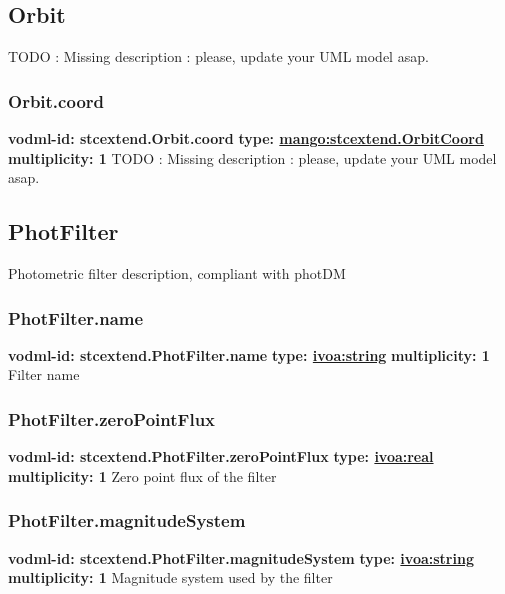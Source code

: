   \subsection{Orbit}
  \label{sect:stcextend.Orbit}
    TODO : Missing description : please, update your UML model asap.

    \subsubsection{Orbit.coord}
      \textbf{vodml-id: stcextend.Orbit.coord} \newline
      \textbf{type: \hyperref[sect:stcextend.OrbitCoord]{mango:stcextend.OrbitCoord}} \newline
      \textbf{multiplicity: 1} \newline 
      TODO : Missing description : please, update your UML model asap.

  \subsection{PhotFilter}
  \label{sect:stcextend.PhotFilter}
    Photometric filter description, compliant with photDM

    \subsubsection{PhotFilter.name}
      \textbf{vodml-id: stcextend.PhotFilter.name} \newline
      \textbf{type: \hyperref[sect:ivoa]{ivoa:string}} \newline
      \textbf{multiplicity: 1} \newline 
      Filter name

    \subsubsection{PhotFilter.zeroPointFlux}
      \textbf{vodml-id: stcextend.PhotFilter.zeroPointFlux} \newline
      \textbf{type: \hyperref[sect:ivoa]{ivoa:real}} \newline
      \textbf{multiplicity: 1} \newline 
      Zero point flux of the filter

    \subsubsection{PhotFilter.magnitudeSystem}
      \textbf{vodml-id: stcextend.PhotFilter.magnitudeSystem} \newline
      \textbf{type: \hyperref[sect:ivoa]{ivoa:string}} \newline
      \textbf{multiplicity: 1} \newline 
      Magnitude system used by the filter

